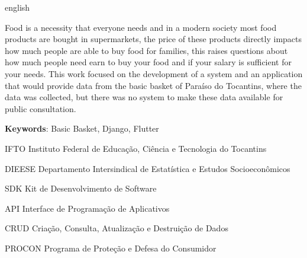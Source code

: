 \documentclass{ifto-tex}
\begin{document}
\begin{resumo}[Abstract]
	\begin{otherlanguage*}{english}
		
		Food is a necessity that everyone needs and in a modern society most food products are bought in supermarkets, the price of these products directly impacts how much people are able to buy food for families, this raises questions about how much people need earn to buy your food and if your salary is sufficient for your needs. This work focused on the development of a system and an application that would provide data from the basic basket of Paraíso do Tocantins, where the data was collected, but there was no system to make these data available for public consultation.
		
		\noindent 
		\textbf{Keywords}: Basic Basket, Django, Flutter
	\end{otherlanguage*}
\end{resumo}


\listoffigures*
\cleardoublepage


\listoftables*
\cleardoublepage

\begin{siglas}
	\item[IFTO]{Instituto Federal de Educação, Ciência e Tecnologia do Tocantins}
	\item[DIEESE]{Departamento Intersindical de Estatística e Estudos Socioeconômicos}
	\item[SDK]{Kit de Desenvolvimento de Software}
	\item [API]{Interface de Programação de Aplicativos}
	\item[CRUD]{Criação, Consulta, Atualização e Destruição de Dados}
	\item[PROCON]{Programa de Proteção e Defesa do Consumidor}
\end{siglas}
\end{document}

